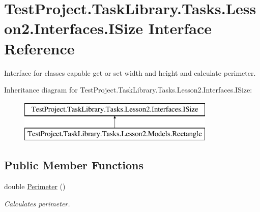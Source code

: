 \hypertarget{interface_test_project_1_1_task_library_1_1_tasks_1_1_lesson2_1_1_interfaces_1_1_i_size}{}\section{Test\+Project.\+Task\+Library.\+Tasks.\+Lesson2.\+Interfaces.\+I\+Size Interface Reference}
\label{interface_test_project_1_1_task_library_1_1_tasks_1_1_lesson2_1_1_interfaces_1_1_i_size}


Interface for classes capable get or set width and height and calculate perimeter.  


Inheritance diagram for Test\+Project.\+Task\+Library.\+Tasks.\+Lesson2.\+Interfaces.\+I\+Size\+:\begin{figure}[H]
\begin{center}
\leavevmode
\includegraphics[height=2.000000cm]{interface_test_project_1_1_task_library_1_1_tasks_1_1_lesson2_1_1_interfaces_1_1_i_size}
\end{center}
\end{figure}
\subsection*{Public Member Functions}
\begin{DoxyCompactItemize}
\item 
double \mbox{\hyperlink{interface_test_project_1_1_task_library_1_1_tasks_1_1_lesson2_1_1_interfaces_1_1_i_size_ae71775505cb328d37ab5d5bc16fc79c7}{Perimeter}} ()
\begin{DoxyCompactList}\small\item\em Calculates perimeter. \end{DoxyCompactList}\end{DoxyCompactItemize}
